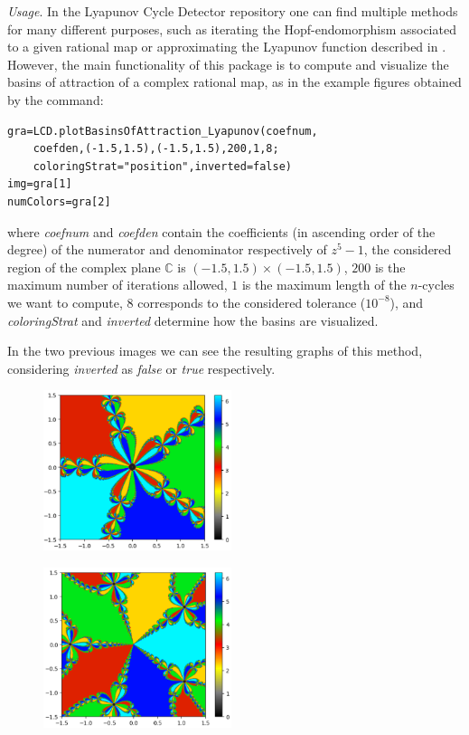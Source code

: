 \documentclass{juliacon}
\begin{document}
\textit{Usage}. In the Lyapunov Cycle Detector repository one can find multiple methods for many different purposes, such as iterating the Hopf-endomorphism associated to a given rational map or approximating the Lyapunov function described in \cite{preprint}. However, the main functionality of this package is to compute and visualize the basins of attraction of a complex rational map, as in the example figures obtained by the command:
\begin{verbatim}
gra=LCD.plotBasinsOfAttraction_Lyapunov(coefnum,
    coefden,(-1.5,1.5),(-1.5,1.5),200,1,8;
    coloringStrat="position",inverted=false)
img=gra[1]
numColors=gra[2]
\end{verbatim}
where \textit{coefnum} and \textit{coefden} contain the coefficients (in ascending order of the degree) of the numerator and denominator respectively of $z^5-1$, the considered region of the complex plane $\mathbb{C}$ is $(-1.5,1.5)\times(-1.5,1.5)$, $200$ is the maximum number of iterations allowed, $1$ is the maximum length of the $n$-cycles we want to compute, $8$ corresponds to the considered tolerance ($10^{-8}$), and \textit{coloringStrat} and \textit{inverted} determine how the basins are visualized.

In the two previous images we can see the resulting graphs of this method, considering \textit{inverted} as \textit{false} or \textit{true} respectively.

\begin{figure}
\begin{center}
    \includegraphics[width=5.5cm]{z^5-1_(origin).PNG}
\end{center}
\end{figure}
\begin{figure}
\begin{center}
    \includegraphics[width=5.5cm]{z^5-1_(infinity).PNG}
\end{center}
\end{figure}



\end{document}

